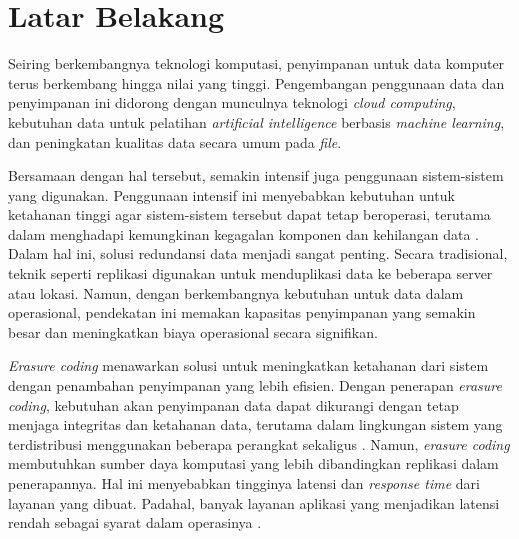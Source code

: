 \section{Latar Belakang}
\label{sec:latar-belakang}

Seiring berkembangnya teknologi komputasi, penyimpanan untuk data komputer terus berkembang hingga nilai yang tinggi. Pengembangan penggunaan data dan penyimpanan ini didorong dengan munculnya teknologi \textit{cloud computing}, kebutuhan data untuk pelatihan \textit{artificial intelligence} berbasis \textit{machine learning}, dan peningkatan kualitas data secara umum pada \textit{file}.


Bersamaan dengan hal tersebut, semakin intensif juga penggunaan sistem-sistem yang digunakan. Penggunaan intensif ini menyebabkan kebutuhan untuk ketahanan tinggi agar sistem-sistem tersebut dapat tetap beroperasi, terutama dalam menghadapi kemungkinan kegagalan komponen dan kehilangan data \parencite{weatherspoon2002erasure}. Dalam hal ini, solusi redundansi data menjadi sangat penting. Secara tradisional, teknik seperti replikasi digunakan untuk menduplikasi data ke beberapa server atau lokasi. Namun, dengan berkembangnya kebutuhan untuk data dalam operasional, pendekatan ini memakan kapasitas penyimpanan yang semakin besar dan meningkatkan biaya operasional secara signifikan.

\textit{Erasure coding} menawarkan solusi untuk meningkatkan ketahanan dari sistem dengan penambahan penyimpanan yang lebih efisien. Dengan penerapan \textit{erasure coding}, kebutuhan akan penyimpanan data dapat dikurangi dengan tetap menjaga integritas dan ketahanan data, terutama dalam lingkungan sistem yang terdistribusi menggunakan beberapa perangkat sekaligus \parencite{balaji2018erasure}. Namun, \textit{erasure coding} membutuhkan sumber daya komputasi yang lebih dibandingkan replikasi dalam penerapannya. Hal ini menyebabkan tingginya latensi dan \textit{response time} dari layanan yang dibuat. Padahal, banyak layanan aplikasi yang menjadikan latensi rendah sebagai syarat dalam operasinya \parencite{dean2013tail}.

